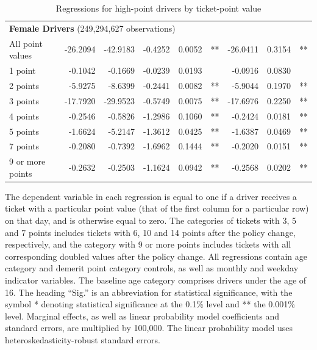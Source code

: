 \documentclass{cje}
\begin{document}
\begin{table}
\begin{tabular}{l r r r r l r r l}
\hline 

\multicolumn{8}{l}{\textbf{Female Drivers} (249,294,627 observations)} \\ 

All point values                &  -26.2094        &  -42.9183       &  -0.4252        &  0.0052       &   **       &  -26.0411        &  0.3154       &   **       \\ 
1 point                         &  -0.1042        &  -0.1669       &  -0.0239        &  0.0193       &            &  -0.0916        &  0.0830       &            \\ 
2 points                        &  -5.9275        &  -8.6399       &  -0.2441        &  0.0082       &   **       &  -5.9044        &  0.1970       &   **       \\ 
3 points                        &  -17.7920        &  -29.9523       &  -0.5749        &  0.0075       &   **       &  -17.6976        &  0.2250       &   **       \\ 
4 points                        &  -0.2546        &  -0.5826       &  -1.2986        &  0.1060       &   **       &  -0.2424        &  0.0181       &   **       \\ 
5 points                        &  -1.6624        &  -5.2147       &  -1.3612        &  0.0425       &   **       &  -1.6387        &  0.0469       &   **       \\ 
7 points                        &  -0.2080        &  -0.7392       &  -1.6962        &  0.1444       &   **       &  -0.2020        &  0.0151       &   **       \\ 
9 or more points                &  -0.2632        &  -0.2503       &  -1.1624        &  0.0942       &   **       &  -0.2568        &  0.0202       &   **       \\ 

\hline 

\end{tabular} 
\caption{Regressions for high-point drivers by ticket-point value} 
The dependent variable in each regression is equal to one  
if a driver receives a ticket with a particular point value   
(that of the first column for a particular row) on that day,  
and is otherwise equal to zero. 
The categories of tickets with 3, 5 and 7 points includes tickets  
with 6, 10 and 14 points after the policy change, respectively,  
and the category with 9 or more points includes tickets  
with all corresponding doubled values after the policy change. 
All regressions contain age category and demerit point category controls, 
as well as monthly and weekday indicator variables. 
The baseline age category comprises drivers under the age of 16. 
The heading ``Sig.'' is an abbreviation for statistical significance, with 
the symbol * denoting statistical significance at the 0.1\% level 
and ** the 0.001\% level. 
Marginal effects, as well as linear probability model coefficients and standard errors, are  
multiplied by 100,000.  
The linear probability model uses heteroskedasticity-robust standard errors.  
\label{tab:seas_Logit_vs_LPMx100K_high_pt_regs_by_points} 
\end{table} 
 
\end{document}
